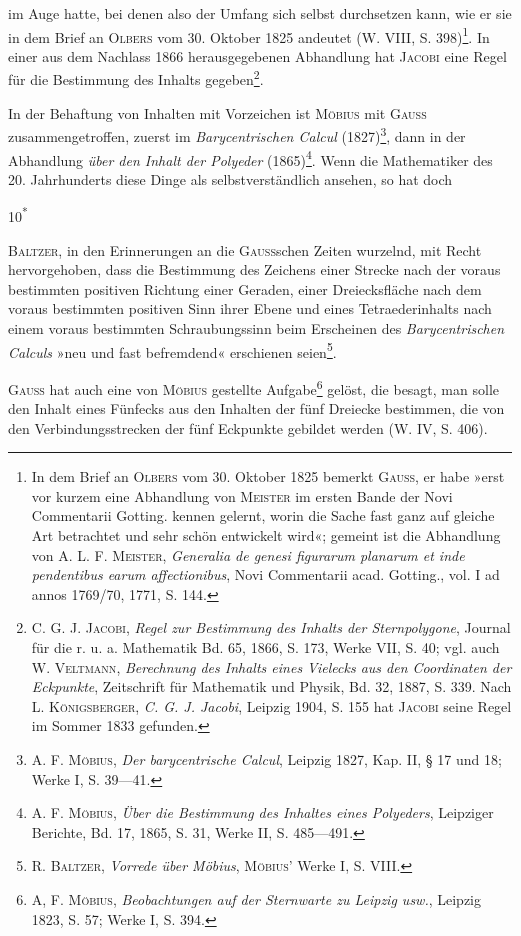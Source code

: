 im Auge hatte, bei denen also der Umfang sich selbst durchsetzen kann, wie
er sie in dem Brief an \textsc{Olbers} vom 30. Oktober 1825 andeutet (W. VIII,
S. 398)\footnote{In dem Brief an \textsc{Olbers} vom 30. Oktober 1825 bemerkt \textsc{Gauss}, er habe »erst vor kurzem eine Abhandlung von \textsc{Meister} im ersten Bande der Novi Commentarii Gotting. kennen gelernt, worin die Sache fast ganz auf gleiche Art betrachtet und sehr schön entwickelt wird«; gemeint ist die Abhandlung von A. L. F. \textsc{Meister}, \textit{Generalia de genesi figurarum planarum et inde pendentibus earum affectionibus}, Novi Commentarii acad. Gotting., vol. I ad annos 1769/70, 1771, S. 144.}. In einer aus dem Nachlass 1866 herausgegebenen Abhandlung hat
\textsc{Jacobi} eine Regel für die Bestimmung des Inhalts gegeben\footnote{C. G. J. \textsc{Jacobi}, \textit{Regel zur Bestimmung des Inhalts der Sternpolygone}, Journal für die r. u. a. Mathematik Bd. 65, 1866, S. 173, Werke VII, S. 40; vgl. auch W. \textsc{Veltmann}, \textit{Berechnung des Inhalts eines Vielecks aus den Coordinaten der Eckpunkte}, Zeitschrift für Mathematik und Physik, Bd. 32, 1887, S. 339. Nach L. \textsc{Königsberger}, \textit{C. G. J. Jacobi}, Leipzig 1904, S. 155 hat \textsc{Jacobi} seine Regel im Sommer 1833 gefunden.}.
\par
In der Behaftung von Inhalten mit Vorzeichen ist \textsc{Möbius} mit \textsc{Gauss}
zusammengetroffen, zuerst im \textit{Barycentrischen Calcul} (1827)\footnote{A. F. \textsc{Möbius}, \textit{Der barycentrische Calcul}, Leipzig 1827, Kap. II, § 17 und 18; Werke I, S. 39—41.}, dann in der Abhandlung
\textit{über den Inhalt der Polyeder} (1865)\footnote{A. F. \textsc{Möbius}, \textit{Über die Bestimmung des Inhaltes eines Polyeders}, Leipziger Berichte, Bd. 17, 1865, S. 31, Werke II, S. 485—491.}. Wenn die Mathematiker des
20. Jahrhunderts diese Dinge als selbstverständlich ansehen, so hat doch
\par\smallskip\noindent\hfill{\small 10\textsuperscript{*}}\par
\clearpage{}\setcounter{footnote}{0}
\noindent \textsc{Baltzer}, in den Erinnerungen an die \textsc{Gauss}schen Zeiten wurzelnd, mit Recht
hervorgehoben, dass die Bestimmung des Zeichens einer Strecke nach der
voraus bestimmten positiven Richtung einer Geraden, einer Dreiecksfläche
nach dem voraus bestimmten positiven Sinn ihrer Ebene und eines Tetraederinhalts
nach einem voraus bestimmten Schraubungssinn beim Erscheinen des
\textit{Barycentrischen Calculs} »neu und fast befremdend« erschienen seien\footnote{R. \textsc{Baltzer}, \textit{Vorrede über Möbius}, \textsc{Möbius}’ Werke I, S. VIII.}.
\par
\textsc{Gauss} hat auch eine von \textsc{Möbius} gestellte Aufgabe\footnote{A, F. \textsc{Möbius}, \textit{Beobachtungen auf der Sternwarte zu Leipzig usw.}, Leipzig 1823, S. 57; Werke I, S. 394.} gelöst, die besagt,
man solle den Inhalt eines Fünfecks aus den Inhalten der fünf Dreiecke bestimmen,
die von den Verbindungsstrecken der fünf Eckpunkte gebildet werden
(W. IV, S. 406).
\clearpage\endgroup
